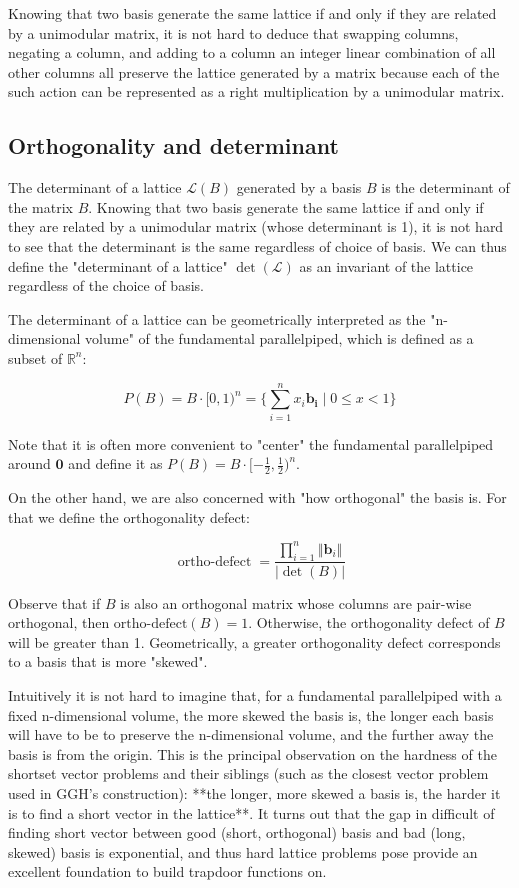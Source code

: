Knowing that two basis generate the same lattice if and only if they are related by a unimodular matrix, it is not hard to deduce that swapping columns, negating a column, and adding to a column an integer linear combination of all other columns all preserve the lattice generated by a matrix because each of the such action can be represented as a right multiplication by a unimodular matrix.

\subsection{Orthogonality and determinant}
The determinant of a lattice $\mathcal{L}(B)$ generated by a basis $B$ is the determinant of the matrix $B$. Knowing that two basis generate the same lattice if and only if they are related by a unimodular matrix (whose determinant is 1), it is not hard to see that the determinant is the same regardless of choice of basis. We can thus define the "determinant of a lattice" $\det(\mathcal{L})$ as an invariant of the lattice regardless of the choice of basis.

The determinant of a lattice can be geometrically interpreted as the "n-dimensional volume" of the fundamental parallelpiped, which is defined as a subset of $\mathbb{R}^n$:

$$
P(B) = B\cdot [0, 1)^n = \{\sum_{i=1}^n x_i\mathbf{b_i} \mid 0\leq x < 1 \}
$$

Note that it is often more convenient to "center" the fundamental parallelpiped around $\mathbf{0}$ and define it as $P(B) = B\cdot [-\frac{1}{2}, \frac{1}{2})^n$.

On the other hand, we are also concerned with "how orthogonal" the basis is. For that we define the orthogonality defect:

$$
\mathop{\text{ortho-defect}} = \frac{\prod_{i=1}^n \Vert \mathbf{b}_i \Vert}{\vert\det(B)\vert}
$$

Observe that if $B$ is also an orthogonal matrix whose columns are pair-wise orthogonal, then $\text{ortho-defect}(B) = 1$. Otherwise, the orthogonality defect of $B$ will be greater than 1. Geometrically, a greater orthogonality defect corresponds to a basis that is more "skewed".

Intuitively it is not hard to imagine that, for a fundamental parallelpiped with a fixed n-dimensional volume, the more skewed the basis is, the longer each basis will have to be to preserve the n-dimensional volume, and the further away the basis is from the origin. This is the principal observation on the hardness of the shortset vector problems and their siblings (such as the closest vector problem used in GGH's construction): **the longer, more skewed a basis is, the harder it is to find a short vector in the lattice**. It turns out that the gap in difficult of finding short vector between good (short, orthogonal) basis and bad (long, skewed) basis is exponential, and thus hard lattice problems pose provide an excellent foundation to build trapdoor functions on.